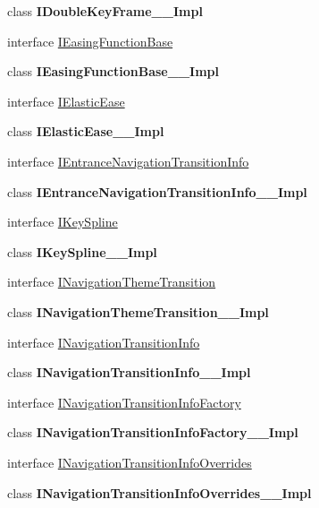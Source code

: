 \begin{DoxyCompactItemize}
\item 
class {\bfseries I\+Double\+Key\+Frame\+\_\+\+\_\+\+Impl}
\item 
interface \hyperlink{interface_windows_1_1_u_i_1_1_xaml_1_1_media_1_1_animation_1_1_i_easing_function_base}{I\+Easing\+Function\+Base}
\item 
class {\bfseries I\+Easing\+Function\+Base\+\_\+\+\_\+\+Impl}
\item 
interface \hyperlink{interface_windows_1_1_u_i_1_1_xaml_1_1_media_1_1_animation_1_1_i_elastic_ease}{I\+Elastic\+Ease}
\item 
class {\bfseries I\+Elastic\+Ease\+\_\+\+\_\+\+Impl}
\item 
interface \hyperlink{interface_windows_1_1_u_i_1_1_xaml_1_1_media_1_1_animation_1_1_i_entrance_navigation_transition_info}{I\+Entrance\+Navigation\+Transition\+Info}
\item 
class {\bfseries I\+Entrance\+Navigation\+Transition\+Info\+\_\+\+\_\+\+Impl}
\item 
interface \hyperlink{interface_windows_1_1_u_i_1_1_xaml_1_1_media_1_1_animation_1_1_i_key_spline}{I\+Key\+Spline}
\item 
class {\bfseries I\+Key\+Spline\+\_\+\+\_\+\+Impl}
\item 
interface \hyperlink{interface_windows_1_1_u_i_1_1_xaml_1_1_media_1_1_animation_1_1_i_navigation_theme_transition}{I\+Navigation\+Theme\+Transition}
\item 
class {\bfseries I\+Navigation\+Theme\+Transition\+\_\+\+\_\+\+Impl}
\item 
interface \hyperlink{interface_windows_1_1_u_i_1_1_xaml_1_1_media_1_1_animation_1_1_i_navigation_transition_info}{I\+Navigation\+Transition\+Info}
\item 
class {\bfseries I\+Navigation\+Transition\+Info\+\_\+\+\_\+\+Impl}
\item 
interface \hyperlink{interface_windows_1_1_u_i_1_1_xaml_1_1_media_1_1_animation_1_1_i_navigation_transition_info_factory}{I\+Navigation\+Transition\+Info\+Factory}
\item 
class {\bfseries I\+Navigation\+Transition\+Info\+Factory\+\_\+\+\_\+\+Impl}
\item 
interface \hyperlink{interface_windows_1_1_u_i_1_1_xaml_1_1_media_1_1_animation_1_1_i_navigation_transition_info_overrides}{I\+Navigation\+Transition\+Info\+Overrides}
\item 
class {\bfseries I\+Navigation\+Transition\+Info\+Overrides\+\_\+\+\_\+\+Impl}
\item 

\end{DoxyCompactItemize}
